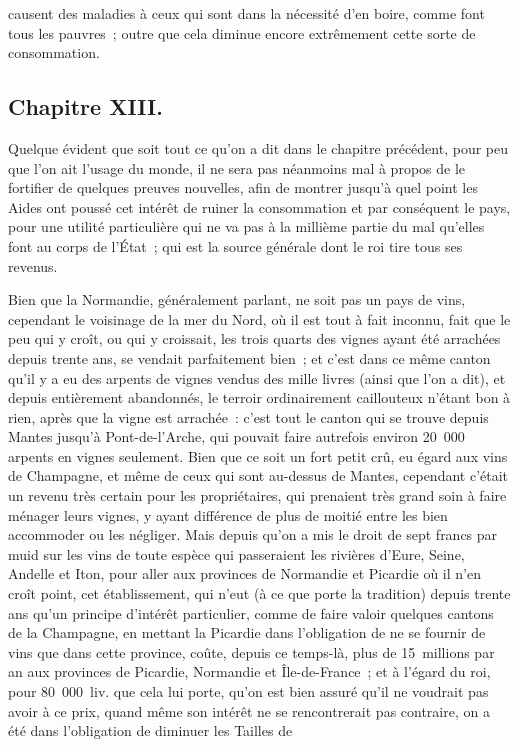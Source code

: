 \documentclass[french,twoside]{book} %
\begin{document}
causent des maladies à ceux qui sont dans la nécessité d’en boire, comme font tous les pauvres ; outre que cela diminue encore extrêmement cette sorte de consommation.
\subsection[{Chapitre XIII.}]{Chapitre XIII.}
\noindent Quelque évident que soit tout ce qu’on a dit dans le chapitre précédent, pour peu que l’on ait l’usage du monde, il ne sera pas néanmoins mal à propos de le fortifier de quelques preuves nouvelles, afin de montrer jusqu’à quel point les Aides ont poussé cet intérêt de ruiner la consommation et par conséquent le pays, pour une utilité particulière qui ne va pas à la millième partie du mal qu’elles font au corps de l’État ; qui est la source générale dont le roi tire tous ses revenus.\par
Bien que la Normandie, généralement parlant, ne soit pas un pays de vins, cependant le voisinage de la mer du Nord, où il est tout à fait inconnu, fait que le peu qui y croît, ou qui y croissait, les trois quarts des vignes ayant été arrachées depuis trente ans, se vendait parfaitement bien ; et c’est dans ce même canton qu’il y a eu des arpents de vignes vendus des mille livres (ainsi que l’on a dit), et depuis entièrement abandonnés, le terroir ordinairement caillouteux n’étant bon à rien, après que la vigne est arrachée : c’est tout le canton qui se trouve depuis Mantes jusqu’à Pont-de-l’Arche, qui pouvait faire autrefois environ 20 000 arpents en vignes seulement. Bien que ce soit un fort petit crû, eu égard aux vins de Champagne, et même de ceux qui sont au-dessus de Mantes, cependant c’était un revenu très certain pour les propriétaires, qui prenaient très grand soin à faire ménager leurs vignes, y ayant différence de plus de moitié entre les bien accommoder ou les négliger. Mais depuis qu’on a mis le droit de sept francs par muid sur les vins de toute espèce qui passeraient les rivières d’Eure, Seine, Andelle et Iton, pour aller aux provinces de Normandie et Picardie où il n’en croît point, cet établissement, qui n’eut (à ce que porte la tradition) depuis trente ans qu’un principe d’intérêt particulier, comme de faire valoir quelques cantons de la Champagne, en mettant la Picardie dans l’obligation de ne se fournir de vins que dans cette province, coûte, depuis ce temps-là, plus de 15 millions par an aux provinces de Picardie, Normandie et Île-de-France ; et à l’égard du roi, pour 80 000 liv. que cela lui porte, qu’on est bien assuré qu’il ne voudrait pas avoir à ce prix, quand même son intérêt ne se rencontrerait pas contraire, on a été dans l’obligation de diminuer les Tailles de\par
\end{document}
